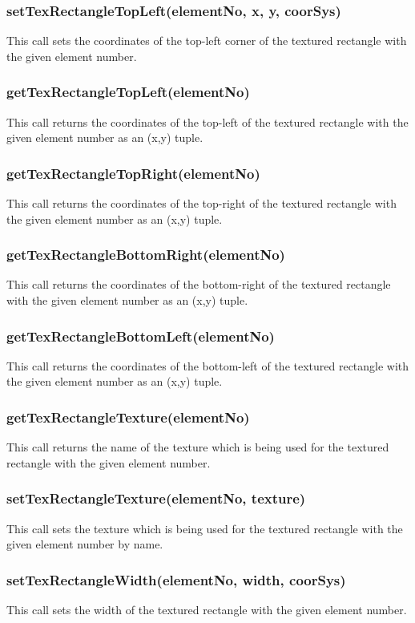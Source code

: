 \documentclass{acm_proc_article-sp}
\begin{document}
\subsubsection{setTexRectangleTopLeft(elementNo, x, y, coorSys)}
This call sets the coordinates of the top-left corner of the textured rectangle with the given element number.
\subsubsection{getTexRectangleTopLeft(elementNo)}
This call returns the coordinates of the top-left of the textured rectangle with the given element number as an (x,y) tuple.
\subsubsection{getTexRectangleTopRight(elementNo)}
This call returns the coordinates of the top-right of the textured rectangle with the given element number as an (x,y) tuple.
\subsubsection{getTexRectangleBottomRight(elementNo)}
This call returns the coordinates of the bottom-right of the textured rectangle with the given element number as an (x,y) tuple.
\subsubsection{getTexRectangleBottomLeft(elementNo)}
This call returns the coordinates of the bottom-left of the textured rectangle with the given element number as an (x,y) tuple.
\subsubsection{getTexRectangleTexture(elementNo)}
This call returns the name of the texture which is being used for the textured rectangle with the given element number.
\subsubsection{setTexRectangleTexture(elementNo, texture)}
This call sets the texture which is being used for the textured rectangle with the given element number by name.
\subsubsection{setTexRectangleWidth(elementNo, width, coorSys)}
This call sets the width of the textured rectangle with the given element number.
\end{document}

